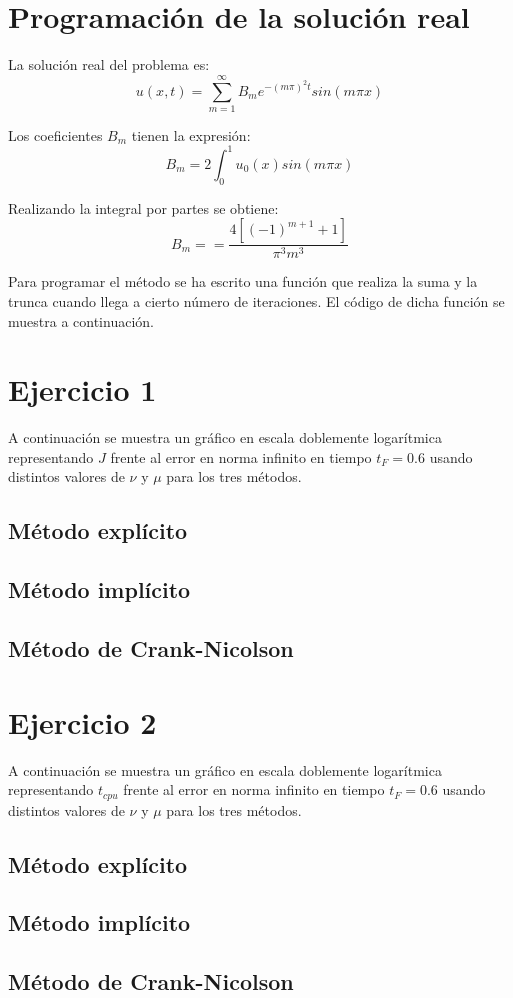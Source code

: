 \documentclass[spanish]{mathnotes}
\begin{document}
	\section{Programación de la solución real}
	La solución real del problema es:
	$$u(x,t) = \sum_{m=1}^\infty B_m e^{-(m\pi)^2 t} sin(m\pi x)$$ 
	
	Los coeficientes $B_m$ tienen la expresión: $$B_m = 2\int_0^1 u_0(x) sin(m\pi x)$$
	
	Realizando la integral por partes se obtiene:
	$$B_m = = \frac{4\left[ (-1)^{m+1}+1\right]}{\pi^3m^3}$$
	
	Para programar el método se ha escrito una función que realiza la suma y la trunca cuando llega a cierto número de iteraciones. El código de dicha función se muestra a continuación.
	
	\lstset{style=matlabStyle}
	
	
	\section{Ejercicio 1}
	A continuación se muestra un gráfico en escala doblemente logarítmica representando $J$ frente al error en norma infinito en tiempo $t_F = 0.6$ usando distintos valores de $\nu$ y $\mu$ para los tres métodos.
	
	\subsection{Método explícito}
	
	
	\subsection{Método implícito}
	
	
	\subsection{Método de Crank-Nicolson}
		
	\section{Ejercicio 2}
	A continuación se muestra un gráfico en escala doblemente logarítmica representando $t_{cpu}$ frente al error en norma infinito en tiempo $t_F = 0.6$ usando distintos valores de $\nu$ y $\mu$ para los tres métodos.
	
	\subsection{Método explícito}
	
	
	\subsection{Método implícito}
	
	
	\subsection{Método de Crank-Nicolson}
	
	
\end{document}
